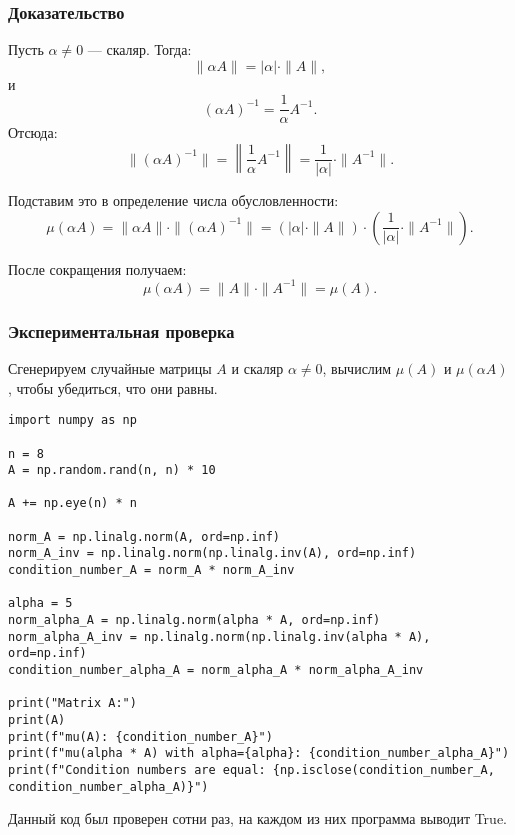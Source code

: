 \subsubsection*{Доказательство}
Пусть $\alpha \neq 0$ --- скаляр. Тогда:
\[
\|\alpha A\| = |\alpha| \cdot \|A\|,
\]
и
\[
(\alpha A)^{-1} = \frac{1}{\alpha} A^{-1}.
\]
Отсюда:
\[
\|(\alpha A)^{-1}\| = \left\|\frac{1}{\alpha} A^{-1}\right\| = \frac{1}{|\alpha|} \cdot \|A^{-1}\|.
\]

Подставим это в определение числа обусловленности:
\[
\mu(\alpha A) = \|\alpha A\| \cdot \|(\alpha A)^{-1}\| = (|\alpha| \cdot \|A\|) \cdot \left(\frac{1}{|\alpha|} \cdot \|A^{-1}\|\right).
\]

После сокращения получаем:
\[
\mu(\alpha A) = \|A\| \cdot \|A^{-1}\| = \mu(A).
\]

\subsubsection*{Экспериментальная проверка}
Сгенерируем случайные матрицы $A$ и скаляр $\alpha \neq 0$, вычислим $\mu(A)$ и $\mu(\alpha A)$, чтобы убедиться, что они равны.

\begin{lstlisting}[caption={Задача 2}]
import numpy as np

n = 8
A = np.random.rand(n, n) * 10

A += np.eye(n) * n

norm_A = np.linalg.norm(A, ord=np.inf)
norm_A_inv = np.linalg.norm(np.linalg.inv(A), ord=np.inf)
condition_number_A = norm_A * norm_A_inv

alpha = 5
norm_alpha_A = np.linalg.norm(alpha * A, ord=np.inf)
norm_alpha_A_inv = np.linalg.norm(np.linalg.inv(alpha * A), ord=np.inf)
condition_number_alpha_A = norm_alpha_A * norm_alpha_A_inv

print("Matrix A:")
print(A)
print(f"mu(A): {condition_number_A}")
print(f"mu(alpha * A) with alpha={alpha}: {condition_number_alpha_A}")
print(f"Condition numbers are equal: {np.isclose(condition_number_A, condition_number_alpha_A)}")
\end{lstlisting}

Данный код был проверен сотни раз, на каждом из них программа выводит True.
